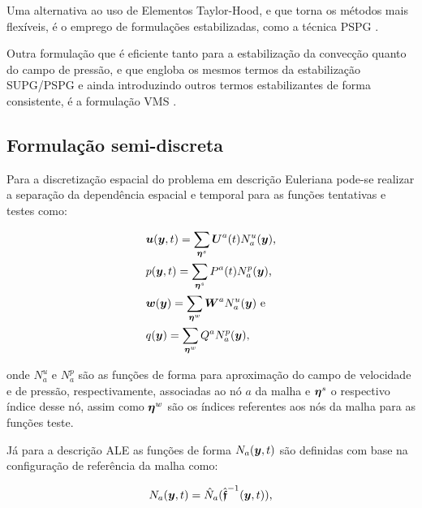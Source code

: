 Uma alternativa ao uso de Elementos Taylor-Hood, e que torna os métodos mais flexíveis, é o emprego de formulações estabilizadas, como a técnica PSPG \cite{tezduyar1991stabilized}.

Outra formulação que é eficiente tanto para a estabilização da convecção quanto do campo de pressão, e que engloba os mesmos termos da estabilização SUPG/PSPG e ainda introduzindo outros termos estabilizantes de forma consistente, é a formulação VMS \cite{bazilevs2013computational}.

\subsection{Formulação semi-discreta}

Para a discretização espacial do problema em descrição Euleriana pode-se realizar a separação da dependência espacial e temporal para as funções tentativas e testes como:

\begin{subequations}
    \begin{align}
         & \boldsymbol{u}(\boldsymbol{y},t)=\sum_{\boldsymbol{\eta}^s}{\boldsymbol{U}^a(t)N_a^u(\boldsymbol{y})}\text{,}\label{eq:uh} \\
         & p(\boldsymbol{y},t)=\sum_{\boldsymbol{\eta}^s}{P^a(t)N_a^p(\boldsymbol{y})}\text{,}                        \\
         & \boldsymbol{w}(\boldsymbol{y})=\sum_{\boldsymbol{\eta}^w}{\boldsymbol{W}^aN_a^u(\boldsymbol{y})}\text{ e}\label{eq:w-sep}  \\
         & q(\boldsymbol{y})=\sum_{\boldsymbol{\eta}^w}{Q^aN_a^p(\boldsymbol{y})}\text{,}\label{eq:q-sep}
    \end{align}
\end{subequations}

\noindent onde $N_a^u$ e $N_a^p$ são as funções de forma para aproximação do campo de velocidade e de pressão, respectivamente, associadas ao nó $a$ da malha e $\boldsymbol{\eta}^s$ o respectivo índice desse nó, assim como $\boldsymbol{\eta}^w$ são os índices referentes aos nós da malha para as funções teste.

Já para a descrição ALE as funções de forma $N_a(\boldsymbol{y},t)$ são definidas com base na configuração de referência da malha como:

\begin{equation}
    N_a(\boldsymbol{y},t)=\hat{N}_a(\hat{\boldsymbol{\mathfrak{f}}}^{-1}(\boldsymbol{y},t))\text{,}
\end{equation}

